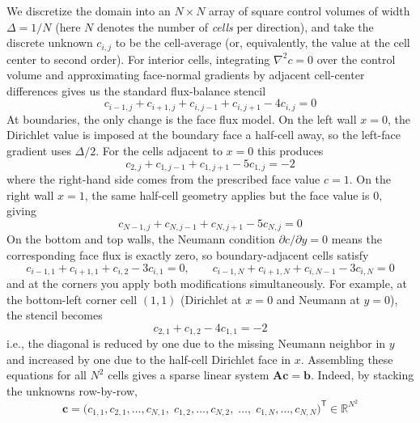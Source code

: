 \begin{exampleBox}
    We discretize the domain into an $N\times N$ array of square control volumes of width $\Delta=1/N$ (here $N$ denotes the number of \textit{cells} per direction), and take the discrete unknown $c_{i,j}$ to be the cell-average (or, equivalently, the value at the cell center to second order). For interior cells, integrating $\nabla^2 c=0$ over the control volume and approximating face-normal gradients by adjacent cell-center differences gives us the standard flux-balance stencil
    \begin{equation}
        c_{i-1,j}+c_{i+1,j}+c_{i,j-1}+c_{i,j+1}-4c_{i,j}=0
    \end{equation}
    At boundaries, the only change is the face flux model. On the left wall $x=0$, the Dirichlet value is imposed at the boundary face a half-cell away, so the left-face gradient uses $\Delta/2$. For the cells adjacent to $x=0$ this produces
    \begin{equation}
        c_{2,j}+c_{1,j-1}+c_{1,j+1}-5c_{1,j}=-2
    \end{equation}
    where the right-hand side comes from the prescribed face value $c=1$. On the right wall $x=1$, the same half-cell geometry applies but the face value is $0$, giving
    \begin{equation}
        c_{N-1,j}+c_{N,j-1}+c_{N,j+1}-5c_{N,j}=0
    \end{equation}
    On the bottom and top walls, the Neumann condition $\partial c/\partial y=0$ means the corresponding face flux is exactly zero, so boundary-adjacent cells satisfy
    \begin{equation}
        c_{i-1,1}+c_{i+1,1}+c_{i,2}-3c_{i,1}=0,\qquad
        c_{i-1,N}+c_{i+1,N}+c_{i,N-1}-3c_{i,N}=0
    \end{equation}
    and at the corners you apply both modifications simultaneously. For example, at the bottom-left corner cell $(1,1)$ (Dirichlet at $x=0$ and Neumann at $y=0$), the stencil becomes
    \begin{equation}
        c_{2,1}+c_{1,2}-4c_{1,1}=-2
    \end{equation}
    i.e., the diagonal is reduced by one due to the missing Neumann neighbor in $y$ and increased by one due to the
    half-cell Dirichlet face in $x$. Assembling these equations for all $N^2$ cells gives a sparse linear system $\mathbf{A}\mathbf{c}=\mathbf{b}$. Indeed, by stacking the unknowns row-by-row,
    \begin{equation}
    \mathbf{c}=\big(c_{1,1},c_{2,1},\ldots,c_{N,1},\;c_{1,2},\ldots,c_{N,2},\;\ldots,\;c_{1,N},\ldots,c_{N,N}\big)^{\mathsf T}\in\mathbb{R}^{N^2}

\end{equation}
\end{exampleBox}
